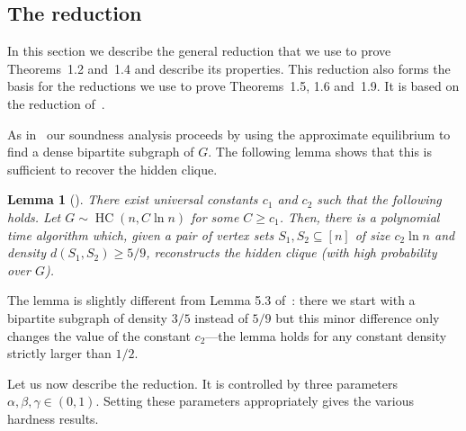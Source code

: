 \documentclass[10pt]{article}
\newtheorem{lemma}[theorem]{Lemma}
\theoremstyle{definition}
\numberwithin{equation}{section}
\newcommand{\HC}[2]{\operatorname{HC}(#1,#2)}
\begin{document}
\subsection{The reduction}\label{sec:reduction}

In this section we describe the general reduction that we use to prove
Theorems~1.2 and~1.4 and
describe its properties. This reduction also forms the basis for the reductions we use to prove Theorems~1.5, 1.6  and~1.9. It is based on the reduction of~\cite{HK11}.

As in~\cite{HK11} our soundness analysis proceeds by using the approximate equilibrium to find a dense
bipartite subgraph of $G$. The following lemma shows %
that this is sufficient to recover the hidden clique.

\begin{lemma}[{\cite[Lemma 5.3]{HK11}}]
  \label{lemma:reconstruct}
  There exist universal constants $c_1$ and $c_2$ such that the
  following holds.  Let $G\sim\HC{n}{C\ln n}$ %
%
 for some $C \ge c_1$.  Then,
  there is a polynomial time algorithm which, given a pair
  of vertex sets $S_1,S_2 \subseteq [n]$ of size $c_2 \ln n$ and
  density $d(S_1,S_2)\geq5/9$, reconstructs the hidden clique (with
  high probability over $G$).
\end{lemma}

The lemma is slightly different from Lemma 5.3 of~\cite{HK11}: there
we start with a bipartite subgraph of density $3/5$ instead of $5/9$
but this minor difference only changes the value of the constant $c_2$---the lemma holds for any constant density strictly larger than
${1}/{2}$.

Let us now describe the reduction.  It is controlled by three
parameters $\alpha, \beta, \gamma \in (0,1)$.  Setting these parameters
  appropriately gives the various hardness results.
\end{document}
